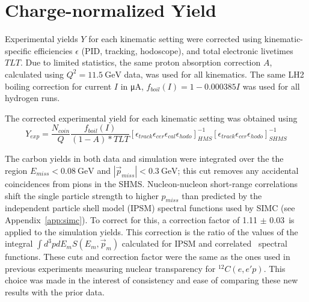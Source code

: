 \section{Charge-normalized Yield}
Experimental yields $Y$ for each kinematic setting were corrected using
kinematic-specific efficiencies $\epsilon$
(PID, tracking, hodoscope), and
total electronic livetimes $TLT$.
Due to limited statistics, the same proton absorption correction $A$,
calculated using $Q^2=\SI{11.5}{\giga\electronvolt}$ data,
was used for all kinematics.
The same LH2 boiling correction for current $I$ in \si{\micro\ampere},
$f_{boil}(I)=1-0.000385I$
was used for all hydrogen runs.

The corrected experimental yield for each kinematic setting was obtained using
\begin{equation}
Y_{exp} = \frac{N_{coin}}{Q}
          \frac{f_{boil}(I)}{(1-A) * TLT}
          \left[
              \epsilon_{track}
              \epsilon_{cer}
              \epsilon_{cal}
              \epsilon_{hodo}
          \right]_{HMS}^{-1}
          \left[
              \epsilon_{track}
              \epsilon_{cer}
              \epsilon_{hodo}
          \right]_{SHMS}^{-1}
\end{equation}


The carbon yields in both data and simulation were integrated over
the the region
$E_{miss} < \SI{0.08}{\giga\electronvolt}$
and
$|\vec{p}_{miss}| < \SI{0.3}{\giga\electronvolt}$; this cut removes
any accidental coincidences from pions in the SHMS.
Nucleon-nucleon short-range correlations shift the single particle strength
to higher $p_{miss}$ than predicted by the independent particle shell model
(IPSM) spectral functions used by SIMC (see Appendix~\ref{app:simc}).
To correct for this, a correction factor of 1.11 $\pm$ 0.03\,\cite{ONeill_1995}
is applied to the simulation yields.
This correction is the ratio of the values of the integral
$\int d^3p dE_m S(E_m,\vec{p}_m)$
calculated for IPSM and correlated~\cite{VanOrden_1980} spectral functions.
These cuts and correction factor were the same as the ones used in
previous experiments measuring nuclear transparency for ${}^{12}C(e,e'p)$.
This choice was made in the interest of consistency and ease of comparing these
new results with the prior data.
